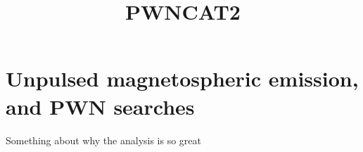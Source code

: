 \documentclass[12pt,preprint]{aastex}
\begin{document}
\title{PWNCAT2}



\listoftodos



\section{Unpulsed magnetospheric emission, and PWN searches}

Something about why the analysis is so great










\end{document}
